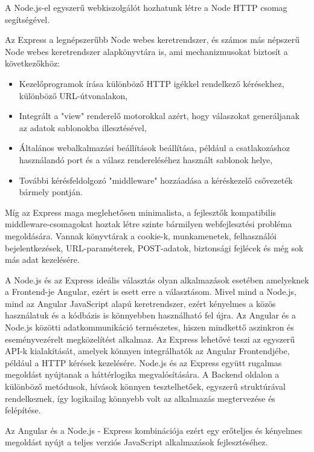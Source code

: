 A Node.js-el egyszerű webkiszolgálót hozhatunk létre a Node HTTP csomag segítségével.

Az Express \cite{Express} a legnépszerűbb Node webes keretrendszer, és számos más népszerű Node webes keretrendszer alapkönyvtára is, ami mechanizmusokat biztosít a következőkhöz:

\begin{itemize}
\item Kezelőprogramok írása különböző HTTP igékkel rendelkező kérésekhez, különböző URL-útvonalakon,
\item Integrált a "view" renderelő motorokkal azért, hogy válaszokat generáljanak az adatok sablonokba illesztésével,
\item Általános webalkalmazási beállítások beállítása, például a csatlakozáshoz használandó port és a válasz rendereléséhez használt sablonok helye,
\item További kérésfeldolgozó "middleware" hozzáadása a kéréskezelő csővezeték bármely pontján.
\end{itemize}


Míg az Express maga meglehetősen minimalista, a fejlesztők kompatibilis middleware-csomagokat hoztak létre szinte bármilyen webfejlesztési probléma megoldására. Vannak könyvtárak a cookie-k, munkamenetek, felhasználói bejelentkezések, URL-paraméterek, POST-adatok, biztonsági fejlécek és még sok más adat kezelésére.

A Node.js és az Express ideális választás olyan alkalmazások esetében amelyeknek a Frontend-je Angular, ezért is esett erre a választásom. Mivel mind a Node.js, mind az Angular JavaScript alapú keretrendszer, ezért kényelmes a közös használatuk és a kódbázis is könnyebben használható fel újra.  Az Angular és a Node.js közötti adatkommunikáció természetes, hiszen mindkettő aszinkron és eseményvezérelt megközelítést alkalmaz. Az Express lehetővé teszi az egyszerű API-k kialakítását, amelyek könnyen integrálhatók az Angular Frontendjébe, például a HTTP kérések kezelésére. Node.js és az Express együtt rugalmas megoldást nyújtanak a háttérlogika megvalósítására. A Backend oldalon a különböző metódusok, hívások könnyen tesztelhetőek, egyszerű struktúrával rendelkeznek, így logikailag könnyebb volt az alkalmazás megtervezése és felépítése. 

Az Angular és a Node.js - Express kombinációja ezért egy erőteljes és kényelmes megoldást nyújt a teljes verziós JavaScript alkalmazások fejlesztéséhez. 
\cite{Node}
